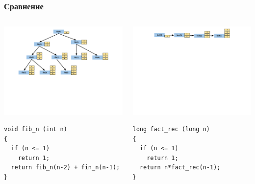\documentclass{beamer}
\begin{document}
\begin{frame}[fragile]
\frametitle{Сравнение}

\begin{columns}[t]
  \begin{column}{0.5\textwidth}


\includegraphics[width=7cm]{images/fib_stack}

\vspace{-50px}

\begin{flushleft}
\begin{lstlisting}
void fib_n (int n)
{
  if (n <= 1)
    return 1;
  return fib_n(n-2) + fin_n(n-1);
}
\end{lstlisting}  
\end{flushleft}


  \end{column}
  \begin{column}{0.5\textwidth}
\vspace{-1px}
\includegraphics[width=7cm]{images/fact_stack}

\vspace{-40px}

\begin{lstlisting}
long fact_rec (long n)
{
  if (n <= 1)
    return 1;
  return n*fact_rec(n-1);
}
\end{lstlisting}
  \end{column}
\end{columns}


\end{frame}
\end{document}
